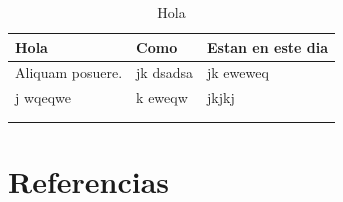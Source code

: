 \documentclass[11pt]{article}
\begin{document}
\begin{table}[htbp]
\centering
\begin{tabular}{|l|l|l|}
\hline
Hola & Como & Estan en este dia\\
\hline
Aliquam posuere. & jk dsadsa & jk eweweq\\
j wqeqwe & k eweqw & jkjkj\\
 &  & \\
 &  & \\
\hline
\end{tabular}
\caption{Hola}

\end{table}

\section{Referencias}
\label{sec:org0f8504e}
\printbibliography[heading=none]
\end{document}
